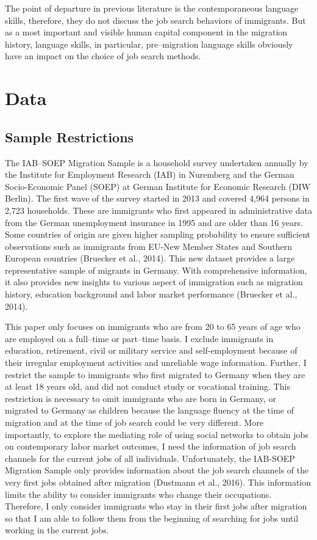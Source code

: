 \documentclass[12pt,a4paper]{article}
\begin{document}
The point of departure in previous literature is the contemporaneous language skills, therefore, they do not discuss the job search behaviors of immigrants. But as a most important and visible human capital component in the migration history, language skills, in particular, pre--migration language skills obviously have an impact on the choice of job search methods. 


\section{Data}
\subsection{Sample Restrictions}

The IAB--SOEP Migration Sample is a household survey undertaken annually by the Institute for Employment Research (IAB) in Nuremberg and the German Socio-Economic Panel (SOEP) at German Institute for Economic Research (DIW Berlin). The first wave of the survey started in 2013 and covered 4,964 persons in 2,723 households. These are immigrants who first appeared in administrative data from the German unemployment insurance in 1995 and are older than 16 years. Some countries of origin are given higher sampling probability to ensure sufficient observations such as immigrants from EU-New Member States and Southern European countries (Bruecker et al., 2014). This new dataset provides a large representative sample of migrants in Germany. With comprehensive information, it also provides new insights to various aspect of immigration such as migration history, education background and labor market performance (Bruecker et al., 2014).

This paper only focuses on immigrants who are from 20 to 65 years of age who are employed on a full--time or part--time basis. I exclude immigrants in education, retirement, civil or military service and self-employment because of their irregular employment activities and unreliable wage information. Further, I restrict the sample to immigrants who first migrated to Germany when they are at least 18 years old, and did not conduct study or vocational training. This restriction is necessary to omit immigrants who are born in Germany, or migrated to Germany as children because the language fluency at the time of migration and at the time of job search could be very different. More importantly, to explore the mediating role of using social networks to obtain jobs on contemporary labor market outcomes, I need the information of job search channels for the current jobs of all individuals. Unfortunately, the IAB-SOEP Migration Sample only provides information about the job search channels of the very first jobs obtained after migration (Dustmann et al., 2016). This information limits the ability to consider immigrants who change their occupations. Therefore, I only consider immigrants who stay in their first jobs after migration so that I am able to follow them from the beginning of searching for jobs until working in the current jobs. 
\end{document}
